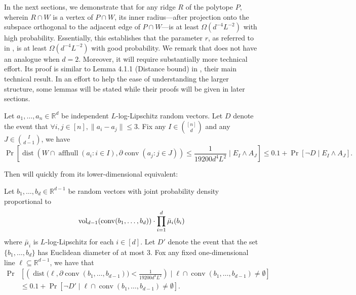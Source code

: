 \documentclass{article}\usepackage[a4paper,margin=20mm]{geometry}
\newcommand{\R}{\mathbb R}
\newcommand{\aff}{\operatorname{affhull}}
\newcommand{\conv}{\operatorname{conv}}
\newcommand{\dist}{\operatorname{dist}}
\newcommand{\vol}{\operatorname{vol}}
\renewcommand{\subset}{\subseteq}
\begin{document}
In the next sections, we demonstrate that for any ridge $R$ of the polytope $P$, wherein $R \cap W$ is a vertex of $P \cap W$, its inner radius—after projection onto the subspace orthogonal to the adjacent edge of $P \cap W$—is at least $\Omega(d^{-4}L^{-2})$ with high probability.
Essentially, this establishes that the parameter $r$, as referred to in , is at least $\Omega(d^{-4}L^{-2})$ with good probability.
We remark that  does not have an analogue when $d=2$.
Moreover, it will require substantially more technical effort.
Its proof is similar to Lemma 4.1.1 (Distance bound) in \cite{ST04}, their main technical result.
In an effort to help the ease of understanding the larger structure, some lemmas will be stated
while their proofs will be given in later sections.

\begin{lemma}\label{lem:rand-r-lb}
    Let $a_1, \ldots, a_n \in \R^d$ be independent $L$-log-Lipschitz random vectors.
    Let $D$ denote the event that $\forall i, j \in [n], \|a_i - a_j\| \leq 3$.
    Fix any $I \in \binom{[n]}{d}$
    and any $J \in \binom{I}{d-1}$, we have
    \[
        \Pr[\dist(W \cap \aff(a_i : i\in I),
        \partial \conv(a_j : j\in J )) \leq \frac{1}{19200 d^4L^2} \mid E_I \wedge A_J ] \leq 0.1 + \Pr[\neg D \mid E_I \wedge A_J].
    \]
\end{lemma}

Then  will  quickly from its lower-dimensional equivalent:
\begin{lemma}\label{lem:rand-r-b}
    Let $b_1,\dots,b_d \in \R^{d-1}$ be random vectors with joint probability density proportional to
    \begin{align*}
        \vol_{d-1}(\conv(b_1, \ldots, b_d)) \cdot \prod_{i=1}^d \Bar{\mu}_i(b_i)
    \end{align*}
    where $\bar{\mu}_i$ is $L$-log-Lipschitz for each $i \in [d]$.
    Let $D'$ denote the event that the set $\{b_1,\dots,b_d\}$ has Euclidean diameter of at most $3$.
    Fox any fixed one-dimensional line $\ell \subset \R^{d-1}$, we have that
    \begin{align*}
        \Pr&\left[ \left(\dist \big(\ell, \partial \conv(b_1,\dots,b_{d-1}) \big)
        < \frac{1}{19200 d^4 L^2} \right) \mid \ell \cap \conv(b_1,\dots,b_{d-1}) \neq \emptyset \right] \\
           &\leq 0.1 + \Pr[\neg D'\mid \ell \cap \conv(b_1,\dots,b_{d-1}) \neq \emptyset].
    \end{align*}
\end{lemma}
\end{document}
